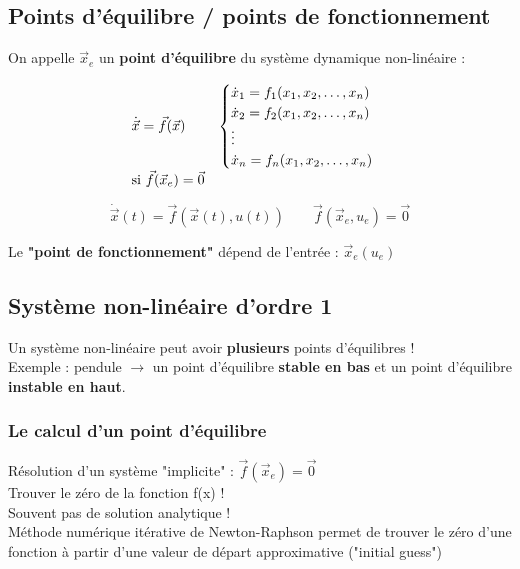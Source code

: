 \documentclass[document.tex]{subfiles}
\begin{document}
\subsection{Points d'équilibre / points de fonctionnement}

On appelle $\vec{x}_e$ un \textbf{point d'équilibre} du système dynamique non-linéaire :

$$
\begin{array}{l l}
\dot{\vec{x}}=\vec{f}(\vec{x}) & \begin{cases} \dot{x}_1 = f_1(x_1,x_2,\ldots,x_n) \\ \dot{x}_2 = f_2(x_1,x_2,\ldots,x_n) \\
\vdots \\ \dot{x}_n = f_n(x_1,x_2,\ldots,x_n) \end{cases} \\
\text{si } \vec{f}(\vec{x}_e)=\vec{0}
\end{array}
$$

$$ \dot{\vec{x}}(t) = \vec{f}(\vec{x}(t),u(t)) \quad \quad \vec{f}(\vec{x}_e,u_e) = \vec{0}$$ 

Le \textbf{"point de fonctionnement"} dépend de l'entrée : $ \vec{x}_e(u_e)$

\subsection{Système non-linéaire d'ordre 1}

Un système non-linéaire peut avoir \textbf{plusieurs} points d'équilibres !\\

Exemple : pendule $\longrightarrow$ un point d'équilibre \textbf{stable en bas} et un point d'équilibre \textbf{instable en haut}.

\subsubsection{Le calcul d'un point d'équilibre}
Résolution d'un système "implicite" : $\boxed{\vec{f}(\vec{x}_e)=\vec{0}}$\\
Trouver le zéro de la fonction f(x) ! \\

Souvent pas de solution analytique !\\

Méthode numérique itérative de Newton-Raphson permet de trouver le zéro d'une fonction à partir d'une valeur de départ approximative ("initial guess")
\end{document}
